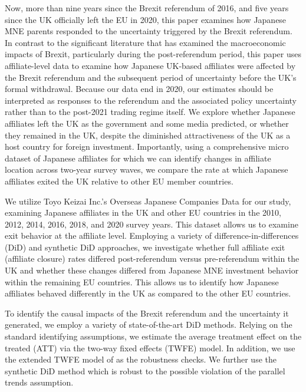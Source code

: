 \documentclass[preprint,11pt,authoryear]{elsarticle}
\begin{document}
Now, more than nine years since the Brexit referendum of 2016, and five years since the UK officially left the EU in 2020, this paper examines how Japanese MNE parents responded to the uncertainty triggered by the Brexit referendum. In contrast to the significant literature that has examined the macroeconomic impacts of Brexit, particularly during the post-referendum period, this paper uses affiliate-level data to examine how Japanese UK-based affiliates were affected by the Brexit referendum and the subsequent period of uncertainty before the UK's formal withdrawal. Because our data end in 2020, our estimates should be interpreted as responses to the referendum and the associated policy uncertainty rather than to the post-2021 trading regime itself. We explore whether Japanese affiliates left the UK as the government and some media predicted, or whether they remained in the UK, despite the diminished attractiveness of the UK as a host country for foreign investment.
Importantly, using a comprehensive micro dataset of Japanese affiliates for which we can identify changes in affiliate location across two-year survey waves, we compare the rate at which Japanese affiliates exited the UK relative to other EU member countries.


We utilize Toyo Keizai Inc.’s Overseas Japanese Companies Data for our study, examining Japanese affiliates in the UK and other EU countries in the 2010, 2012, 2014, 2016, 2018, and 2020 survey years. This dataset allows us to examine exit behavior at the affiliate level. Employing a variety of difference-in-differences (DiD) and synthetic DiD approaches, we investigate whether full affiliate exit (affiliate closure) rates differed post-referendum versus pre-referendum within the UK and whether these changes differed from Japanese MNE investment behavior within the remaining EU countries. This allows us to identify how Japanese affiliates behaved differently in the UK as compared to the other EU countries.


To identify the causal impacts of\textbf{ }the Brexit referendum and the uncertainty it generated, we employ a variety of state-of-the-art DiD methods. 
Relying on the standard identifying assumptions, we estimate the average treatment effect on the treated (ATT) via the two-way fixed effects (TWFE) model.
In addition, we use the extended TWFE model of \cite{wooldridge2021two} as the robustness checks.
We further use the synthetic DiD method which is robust to the possible violation of the parallel trends assumption.
\end{document}
